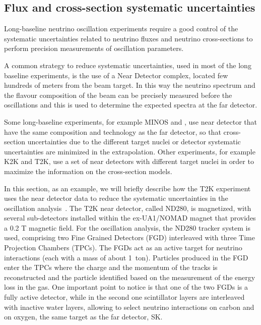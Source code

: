  

\subsection{Flux and cross-section systematic uncertainties}
\label{sec:beamsyst}

Long-baseline neutrino oscillation experiments require a good control of the systematic uncertainties related to neutrino fluxes and neutrino cross-sections to perform precision measurements of oscillation parameters. 

A common strategy to reduce systematic uncertainties, used in most of the long baseline experiments, is the use of a Near Detector complex, located few hundreds of meters from the beam target. In this way the neutrino spectrum and the flavour composition of the beam can be precisely measured before the oscillations and this is used to determine the expected spectra at the far detector.

Some long-baseline experiments, for example MINOS and \nova, use near detector  that have the same composition and technology as the far detector, so that cross-section uncertainties due to the different target nuclei or detector systematic uncertainties are minimized in the extrapolation. Other experiments, for example K2K and T2K, use a set of near detectors with different target nuclei in order to maximize the information on the cross-section models.

In this section, as an example, we will briefly describe how the T2K experiment uses the near detector data to reduce the systematic uncertainties in the oscillation analysis~\cite{t2kprd}. The T2K near detector, called ND280, is magnetized, with several sub-detectors installed within the ex-UA1/NOMAD magnet that provides a 0.2 T magnetic field. For the oscillation analysis, the ND280 tracker system is used, comprising two Fine Grained Detectors (FGD) interleaved with three Time Projection Chambers (TPCs). The FGDs act as an active target for neutrino interactions (each with a mass of about 1~ton). Particles produced in the FGD enter the TPCs where the charge and the momentum of the tracks is reconstructed and the particle identified based on the measurement of the energy loss in the gas. One important point to notice is that one of the two FGDs is a fully active detector, while in the second one scintillator layers are interleaved with inactive water layers, allowing to select neutrino interactions on carbon and on oxygen, the same target as the far detector, SK. 
    
